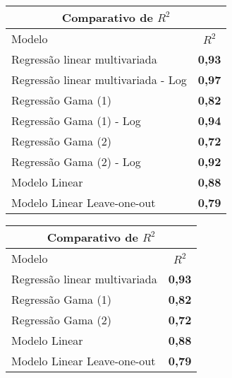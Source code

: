 \documentclass{article}
\begin{document}
\begin{table}[]
	\centering
	\begin{tabular}{lc}
		\hline
		\multicolumn{2}{c}{\textbf{Comparativo de $R^{2}$}} \\ \hline
		Modelo                         & \textbf{$R^{2}$}   \\ \hline
		Regressão linear multivariada  & \textbf{0,93}      \\
		Regressão linear multivariada - Log            & \textbf{0,97}      \\
		Regressão Gama (1)                & \textbf{0,82}          \\
		Regressão Gama (1) - Log          & \textbf{0,94}          \\
		Regressão Gama (2)         	   & \textbf{0,72}      \\
		Regressão Gama (2) - Log   	   & \textbf{0,92}      \\
		Modelo Linear                  & \textbf{0,88}      \\
		Modelo Linear Leave-one-out    & \textbf{0,79}      \\ \hline
	\end{tabular}
\end{table}





\begin{table}[]
	\centering
	\begin{tabular}{lc}
		\hline
		\multicolumn{2}{c}{\textbf{Comparativo de $R^{2}$}} \\ \hline
		Modelo                         & \textbf{$R^{2}$}   \\ \hline
		Regressão linear multivariada                  & \textbf{0,93}      \\
		Regressão Gama (1)         	 & \textbf{0,82}      \\
		Regressão Gama (2)         	 & \textbf{0,72}      \\
		Modelo Linear                  & \textbf{0,88}      \\
		Modelo Linear Leave-one-out    & \textbf{0,79}      \\ \hline 
	\end{tabular}
\end{table}
\end{document}
